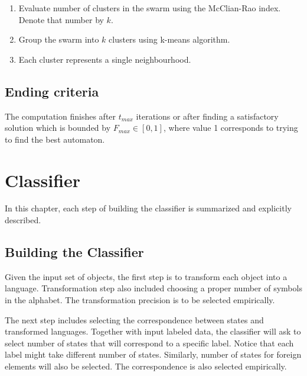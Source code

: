 \documentclass{mini}
\begin{document}
\begin{enumerate}
    \item Evaluate number of clusters in the swarm using the McClian-Rao index. Denote that number by $k$.
    \item Group the swarm into $k$ clusters using k-means algorithm.
    \item Each cluster represents a single neighbourhood.
\end{enumerate}


\section{Ending criteria}
The computation finishes after $t_{max}$ iterations or after finding a satisfactory solution which is bounded by $F_{max} \in [0,1]$, where value 1 corresponds to trying to find the best automaton.

\chapter{Classifier}\label{chap:classification}

In this chapter, each step of building the classifier is summarized and explicitly described.

\section{Building the Classifier}\label{sec:classification_transf_step}
Given the input set of objects, the first step is to transform each object into a language. Transformation step also included choosing a proper number of symbols in the alphabet. The transformation precision is to be selected empirically.

The next step includes selecting the correspondence between states and transformed languages. Together with input labeled data, the classifier will ask to select number of states that will correspond to a specific label. Notice that each label might take different number of states. Similarly, number of states for foreign elements will also be selected. The correspondence is also selected empirically.
\end{document}
